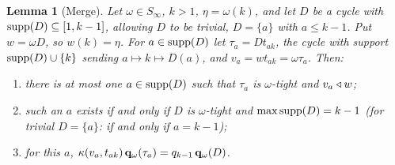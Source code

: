 \documentclass{amsart}
\newtheorem{lemma}{Lemma}[section]
\theoremstyle{definition}
\theoremstyle{remark}
\numberwithin{equation}{section}
\begin{document}
\begin{lemma}[Merge] \label{lemma:merge}
Let $\omega\in S_\infty$, $k>1$, $\eta=\omega(k)$, and let $D$ be a cycle with $\mathrm{supp}(D)\subseteq[1,k-1]$, allowing $D$ to be trivial, $D=\{a\}$ with $a\leq k-1$. Put $w=\omega D$, so $w(k)=\eta$. For $a\in\mathrm{supp}(D)$ let $\tau_a=Dt_{ak}$, the cycle with support $\mathrm{supp}(D)\cup\{k\}$ sending $a\mapsto k\mapsto D(a)$, and $v_a=wt_{ak}=\omega\tau_a$. Then:
\begin{enumerate}
\item[(a)] there is at most one $a\in\mathrm{supp}(D)$ such that $\tau_a$ is $\omega$-tight and $v_a\triangleleft w$;
\item[(b)] such an $a$ exists if and only if $D$ is $\omega$-tight and $\max\mathrm{supp}(D)=k-1$ (for trivial $D=\{a\}$: if and only if $a=k-1$);
\item[(c)] for this $a$, $\kappa(v_a,t_{ak})\,\mathbf{q}_\omega(\tau_a)=q_{k-1}\,\mathbf{q}_\omega(D)$.
\end{enumerate}
\end{lemma}
\end{document}
